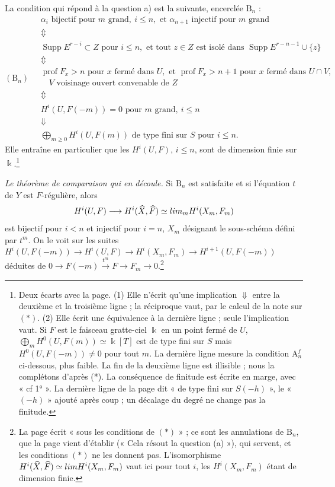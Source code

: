 \documentclass[11pt,a4paper]{article}
\begin{document}
La condition qui répond à la question a) est la suivante, encerclée
$\mathrm{B}_n$ :
\[
(\mathrm{B}_n) \quad
\begin{array}{l}
  \alpha_i \text{ bijectif pour } m \text{ grand},\ i \leq n,
  \text{ et } \alpha_{n+1} \text{ injectif pour } m \text{ grand} \\
  \Updownarrow \\
  \operatorname{Supp} E^{r-i} \subset Z \text{ pour } i \leq n, \text{ et tout } z \in Z \text{ est isolé dans } \operatorname{Supp} E^{r-n-1} \cup \lbrace z \rbrace \\
  \Updownarrow \\
  \operatorname{prof} F_x > n \text{ pour } x \text{ fermé dans } U, \text{ et } \operatorname{prof} F_x > n+1 \text{ pour } x \text{ fermé dans } U \cap V, \\
  \quad V \text{ voisinage ouvert convenable de } Z \\
  \Updownarrow \\
  H^i(U, F(-m)) = 0 \text{ pour } m \text{ grand},\ i \leq n \\
  \Downarrow \\
  \bigoplus_{m \geq 0} H^i(U, F(m)) \text{ de type fini sur } S \text{ pour } i \leq n .
\end{array}
\]
Elle entraîne en particulier que les $H^i(U, F)$, $i \leq n$, sont de
dimension finie sur $\Bbbk$.\footnote{Deux écarts avec la page. (1) Elle
n'écrit qu'une implication $\Downarrow$ entre la deuxième et la troisième
ligne ; la réciproque vaut, par le calcul de la note sur $(*)$. (2) Elle écrit
une équivalence à la dernière ligne ; seule l'implication vaut. Si $F$ est le
faisceau gratte-ciel $\Bbbk$ en un point fermé de $U$, $\bigoplus_m H^0(U,
F(m)) \simeq \Bbbk[T]$ est de type fini sur $S$ mais $H^0(U, F(-m)) \neq 0$
pour tout $m$. La dernière ligne mesure la condition
$\mathrm{A}^f_n$ ci-dessous, plus faible. La fin de la deuxième ligne est
illisible ; nous la complétons d'après (*). La conséquence de finitude est
écrite en marge, avec « cf 1° ». La dernière ligne de la page dit « de type
fini sur $S(-h)$ », le « $(-h)$ » ajouté après coup ; un décalage du degré ne
change pas la finitude.}

\emph{Le théorème de comparaison qui en découle.} Si $\mathrm{B}_n$ est
satisfaite et si l'équation $t$ de $Y$ est $F$-régulière, alors
\[
  H^i(U, F) \longrightarrow H^i(\widehat{X}, \widehat{F}) \simeq \varprojlim_m H^i(X_m, F_m)
\]
est bijectif pour $i < n$ et injectif pour $i = n$, $X_m$ désignant le
sous-schéma défini par $t^{m}$. On le voit sur les suites
$H^i(U, F(-m)) \to H^i(U, F) \to H^i(X_m, F_m) \to H^{i+1}(U, F(-m))$ déduites
de $0 \to F(-m) \xrightarrow{t^m} F \to F_m \to 0$.\footnote{La page écrit «
sous les conditions de $(*)$ » ; ce sont les annulations de $\mathrm{B}_n$, que
la page vient d'établir (« Cela résout la question (a) »), qui servent, et les
conditions $(*)$ ne les donnent pas. L'isomorphisme
$H^i(\widehat{X}, \widehat{F}) \simeq \varprojlim H^i(X_m, F_m)$ vaut ici
pour tout $i$, les $H^i(X_m, F_m)$ étant de dimension finie.}
\end{document}
